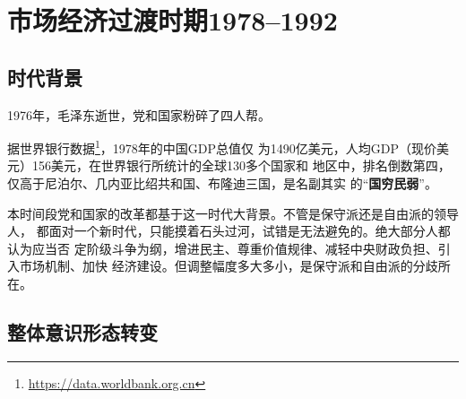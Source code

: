 \chapter{市场经济过渡时期1978--1992}
\label{chap:1978}

\section{时代背景}

1976年，毛泽东逝世，党和国家粉碎了四人帮。

据世界银行数据\footnote{\url{https://data.worldbank.org.cn}}，1978年的中国GDP总值仅
为1490亿美元，人均GDP（现价美元）156美元，在世界银行所统计的全球130多个国家和
地区中，排名倒数第四，仅高于尼泊尔、几内亚比绍共和国、布隆迪三国，是名副其实
的“\textbf{国穷民弱}”。

本时间段党和国家的改革都基于这一时代大背景。不管是保守派还是自由派的领导人，
都面对一个新时代，只能摸着石头过河，试错是无法避免的。绝大部分人都认为应当否
定阶级斗争为纲，增进民主、尊重价值规律、减轻中央财政负担、引入市场机制、加快
经济建设。但调整幅度多大多小，是保守派和自由派的分歧所在。


\section{整体意识形态转变}

